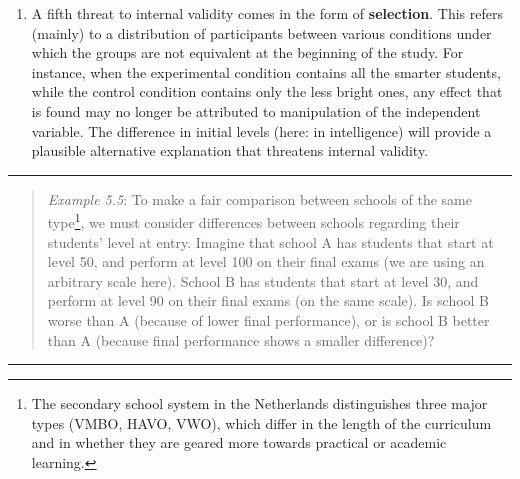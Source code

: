 \documentclass[
]{book}
\providecommand{\tightlist}{%
  \setlength{\itemsep}{0pt}\setlength{\parskip}{0pt}}
\begin{document}
\begin{enumerate}
\def\labelenumi{\arabic{enumi}.}
\setcounter{enumi}{4}
\tightlist
\item
  A fifth threat to internal validity comes in the form of \textbf{selection}. This refers (mainly) to a distribution of participants between various conditions under which the groups are not equivalent at the beginning of the study. For instance, when the experimental condition contains all the smarter students, while the control condition contains only the less bright ones, any effect that is found may no longer be attributed to manipulation of the independent variable. The difference in initial levels (here: in intelligence) will provide a plausible alternative explanation that threatens internal validity.
\end{enumerate}

\begin{center}\rule{0.5\linewidth}{0.5pt}\end{center}

\begin{quote}
\emph{Example 5.5}: To make a fair comparison between schools of the same type\footnote{The secondary school system in the Netherlands distinguishes three major types (VMBO, HAVO, VWO), which differ in the length of the curriculum and in whether they are geared more towards practical or academic learning.}, we must consider differences between schools regarding their students' level at entry. Imagine that school A has students that start at level 50, and perform at level 100 on their final exams (we are using an arbitrary scale here). School B has students that start at level 30, and perform at level 90 on their final exams (on the same scale). Is school B worse than A (because of lower final performance), or is school B better than A (because final performance shows a smaller difference)?
\end{quote}

\begin{center}\rule{0.5\linewidth}{0.5pt}\end{center}
\end{document}
